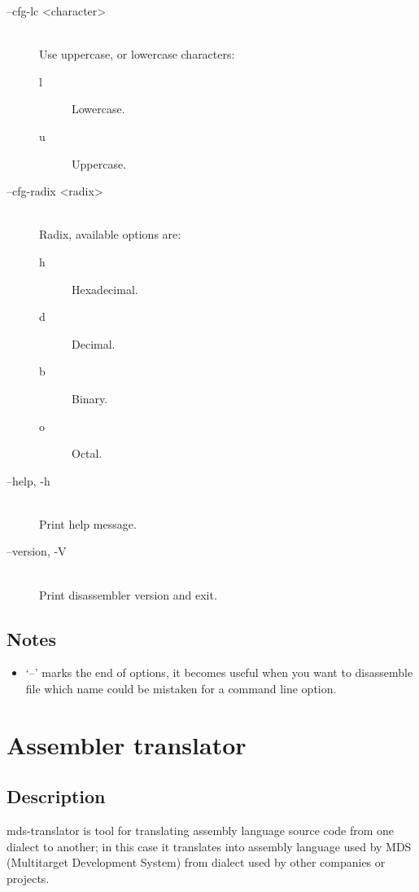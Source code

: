 \begin{description}
            \item[--cfg-lc <character>]~\\
                Use uppercase, or lowercase characters:
                \begin{description}
                    \item [l] Lowercase.
                    \item [u] Uppercase.
                \end{description}

            \item[--cfg-radix <radix>]~\\
                Radix, available options are:
                \begin{description}
                    \item [h] Hexadecimal.
                    \item [d] Decimal.
                    \item [b] Binary.
                    \item [o] Octal.
                \end{description}

            \item[--help, -h]~\\
                Print help message.

            \item[--version, -V]~\\
                Print disassembler version and exit.
        \end{description}

    \subsection{Notes}
        \begin{itemize}
            \item `--' marks the end of options, it becomes useful when you want to disassemble file which name could be mistaken for a command line option.
        \end{itemize}

\section{Assembler translator}
    \subsection{Description}
        mds-translator is tool for translating assembly language source code from one dialect to another; in this case it translates into assembly language used by MDS (Multitarget Development System) from dialect used by other companies or projects.

